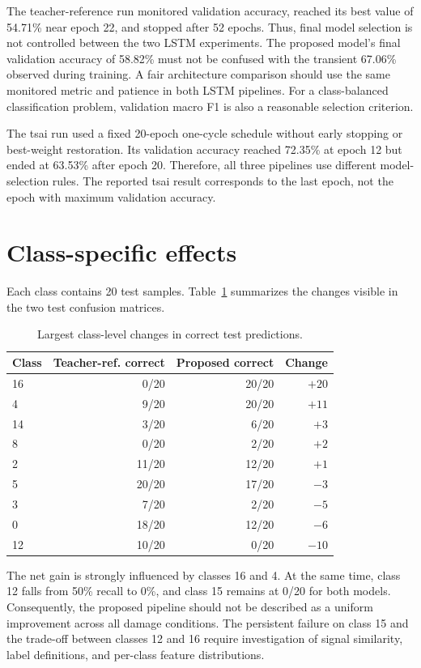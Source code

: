 \documentclass[11pt,a4paper]{article}
\begin{document}
The teacher-reference run monitored validation accuracy, reached its best
value of 54.71\% near epoch 22, and stopped after 52 epochs. Thus, final model
selection is not controlled between the two LSTM experiments. The proposed model's
final validation accuracy of 58.82\% must not be confused with the transient
67.06\% observed during training. A fair architecture comparison should use
the same monitored metric and patience in both LSTM pipelines. For a class-balanced
classification problem, validation macro F1 is also a reasonable selection
criterion.

The tsai run used a fixed 20-epoch one-cycle schedule without early stopping or
best-weight restoration. Its validation accuracy reached 72.35\% at epoch 12
but ended at 63.53\% after epoch 20. Therefore, all three pipelines use
different model-selection rules. The reported tsai result corresponds to the
last epoch, not the epoch with maximum validation accuracy.

\section{Class-specific effects}

Each class contains 20 test samples. Table~\ref{tab:class-changes} summarizes
the changes visible in the two test confusion matrices.

\begin{table}[htbp]
\centering
\caption{Largest class-level changes in correct test predictions.}
\label{tab:class-changes}
\begin{tabular}{@{}lrrr@{}}
\toprule
\textbf{Class} & \textbf{Teacher-ref. correct} &
\textbf{Proposed correct} & \textbf{Change} \\
\midrule
16 &  0/20 & 20/20 & $+20$ \\
4  &  9/20 & 20/20 & $+11$ \\
14 &  3/20 &  6/20 & $+3$ \\
8  &  0/20 &  2/20 & $+2$ \\
2  & 11/20 & 12/20 & $+1$ \\
\midrule
5  & 20/20 & 17/20 & $-3$ \\
3  &  7/20 &  2/20 & $-5$ \\
0  & 18/20 & 12/20 & $-6$ \\
12 & 10/20 &  0/20 & $-10$ \\
\bottomrule
\end{tabular}
\end{table}

The net gain is strongly influenced by classes 16 and 4. At the same time,
class 12 falls from 50\% recall to 0\%, and class 15 remains at 0/20 for both
models. Consequently, the proposed pipeline should not be described as a
uniform improvement across all damage conditions. The persistent failure on
class 15 and the trade-off between classes 12 and 16 require investigation of
signal similarity, label definitions, and per-class feature distributions.
\end{document}

